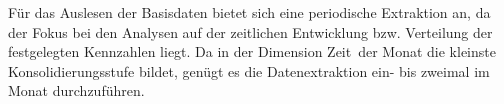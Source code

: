 Für das Auslesen der Basisdaten bietet sich eine periodische Extraktion an, da der Fokus bei den Analysen auf der zeitlichen Entwicklung bzw. Verteilung der festgelegten Kennzahlen liegt.
Da in der Dimension \glqq Zeit\grqq ~der Monat die kleinste Konsolidierungsstufe bildet, genügt es die Datenextraktion  ein- bis zweimal im Monat durchzuführen.